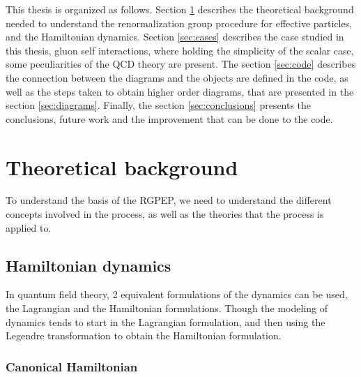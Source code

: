 \documentclass[11pt,a4paper,twoside,pdf]{article}
\numberwithin{equation}{section}
\begin{document}
This thesis is organized as follows. Section \ref{sec:theoretical_background} describes
the theoretical background needed to understand the renormalization group procedure
for effective particles, and the Hamiltonian dynamics. Section \ref{sec:cases}
describes the case studied in this thesis, gluon self interactions, where
holding the simplicity of the scalar case, some peculiarities of the QCD theory are 
present. The section \ref{sec:code} describes the connection between the diagrams 
and the objects are defined in the code, as well as the steps taken to obtain higher 
order diagrams, that are presented in the section \ref{sec:diagrams}. Finally, the 
section \ref{sec:conclusions} presents the conclusions, future work and the 
improvement that can be done to the code.



\section{Theoretical background} \label{sec:theoretical_background}

To understand the basis of the RGPEP, we need to understand the different
concepts involved in the process, as well as the theories that the process is
applied to.  

\subsection{Hamiltonian dynamics}

In quantum field theory, 2 equivalent formulations of the dynamics can be used, 
the Lagrangian and the Hamiltonian formulations. Though the modeling of dynamics 
tends to start in the Lagrangian formulation, and then using the Legendre transformation
to obtain the Hamiltonian formulation. 

\subsubsection{Canonical Hamiltonian}\label{sec:canonical_hamiltonian}
\end{document}

